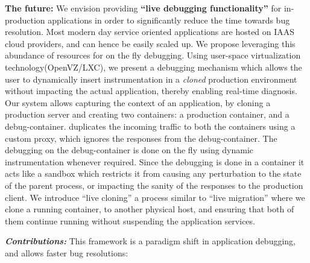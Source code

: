 \textbf{The future: } We envision providing \textbf{``live debugging functionality''} for in-production applications in order to significantly reduce the time towards bug resolution.
Most modern day service oriented applications are hosted on IAAS cloud providers, and can hence be easily scaled  up. 
We propose leveraging this abundance of resources for on the fly debugging.
Using user-space virtualization technology(OpenVZ/LXC\cite{openvz,lxc}), we present a debugging mechanism which allows the user to dynamically insert instrumentation in a \emph{cloned} production environment without impacting the actual application, thereby enabling real-time diagnosis.
Our system \parikshan allows capturing the context of an application, by cloning a production server and creating two containers: a production container, and a debug-container. 
\parikshan duplicates the incoming traffic to both the containers using a custom proxy, which ignores the responses from the debug-container. 
The debugging on the debug-container is done on the fly using dynamic instrumentation whenever required. 
Since the debugging is done in a container it acts like a sandbox which restricts it from causing any perturbation to the state of the parent process, or impacting the sanity of the responses to the production client.
We introduce ``live cloning'' a process similar to ``live migration'' \cite{vmperformance} where we clone a running container, to another physical host, and ensuring that both of them continue running without suspending the application services.

\textit{\textbf{Contributions:}} This framework is a paradigm shift in application debugging, and allows faster bug resolutions:


